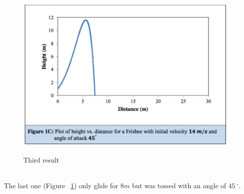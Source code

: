\documentclass[10pt,a4paper]{report}
\begin{document}
\begin{figure}[H]
\centering
\includegraphics[scale=0.6]{graph3.jpg}
\caption{Third result}\cite{art5}
\label{Third result}
\end{figure}
\leavevmode
\\The last one (Figure ~\ref{Third result}) only glide for $8m$ but was tossed with an angle of $45\,^{\circ} $.
\end{document}
